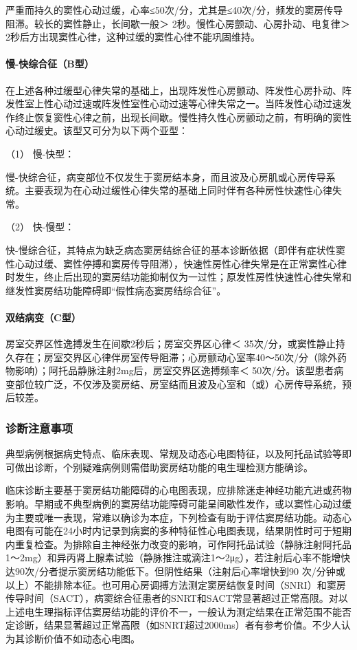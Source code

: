 严重而持久的窦性心动过缓，心率≤50次/分，尤其是≤40次/分，频发的窦房传导阻滞。较长的窦性静止，长间歇一般＞
2秒。慢性心房颤动、心房扑动、电复律＞
2秒后方出现窦性心律，这种过缓的窦性心律不能巩固维持。

\paragraph{慢-快综合征（B型）}

在上述各种过缓型心律失常的基础上，出现阵发性心房颤动、阵发性心房扑动、阵发性室上性心动过速或阵发性室性心动过速等心律失常之一。当阵发性心动过速发作终止恢复窦性心律之前，出现长间歇。慢性持久性心房颤动之前，有明确的窦性心动过缓史。该型又可分为以下两个亚型：

\hypertarget{text00298.htmlux5cux23CHP10-2-11-3-5-2-1}{}
（1） 慢-快型：

慢-快综合征，病变部位不仅发生于窦房结本身，而且波及心房肌或心房传导系统。主要表现为在心动过缓性心律失常的基础上同时伴有各种房性快速性心律失常。

\hypertarget{text00298.htmlux5cux23CHP10-2-11-3-5-2-2}{}
（2） 快-慢型：

快-慢综合征，其特点为缺乏病态窦房结综合征的基本诊断依据（即伴有症状性窦性心动过缓、窦性停搏和窦房传导阻滞），快速性房性心律失常是在正常窦性心律时发生，终止后出现的窦房结功能抑制仅为一过性；原发性房性快速性心律失常和继发性窦房结功能障碍即“假性病态窦房结综合征”。

\paragraph{双结病变（C型）}

房室交界区性逸搏发生在间歇2秒后；房室交界区心律＜
35次/分，或窦性静止持久存在；房室交界区心律伴房室传导阻滞；心房颤动心室率40～50次/分（除外药物影响）；阿托品静脉注射2mg后，房室交界区逸搏频率＜
50次/分。该型患者病变部位较广泛，不仅涉及窦房结、房室结而且波及心室和（或）心房传导系统，预后较差。

\subsubsection{诊断注意事项}

典型病例根据病史特点、临床表现、常规及动态心电图特征，以及阿托品试验等即可做出诊断，个别疑难病例则需借助窦房结功能的电生理检测方能确诊。

临床诊断主要基于窦房结功能障碍的心电图表现，应排除迷走神经功能亢进或药物影响。早期或不典型病例的窦房结功能障碍可能呈间歇性发作，或以窦性心动过缓为主要或唯一表现，常难以确诊为本症，下列检查有助于评估窦房结功能。动态心电图有可能在24小时内记录到病窦的多种特征性心电图表现，结果阴性时可于短期内重复检查。为排除自主神经张力改变的影响，可作阿托品试验（静脉注射阿托品1～2mg）和异丙肾上腺素试验（静脉推注或滴注1～2μg），若注射后心率不能增快达90次/分者提示窦房结功能低下。但阴性结果（注射后心率增快到90
次/分钟或以上）不能排除本征。也可用心房调搏方法测定窦房结恢复时间（SNRI）和窦房传导时间（SACT），病窦综合征患者的SNRT和SACT常显著超过正常高限。对以上述电生理指标评估窦房结功能的评价不一，一般认为测定结果在正常范围不能否定诊断，结果显著超过正常高限（如SNRT超过2000ms）者有参考价值。不少人认为其诊断价值不如动态心电图。


